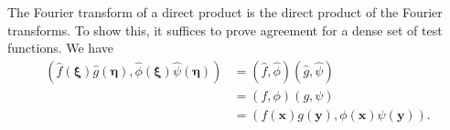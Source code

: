 \begin{Example}
\label{ex:fourier-direct-product}
The Fourier transform of a direct product is the direct product of the Fourier transforms. To show this, it suffices to prove agreement for a dense set of test functions. We have
\begin{equation}\label{eq:fourier-direct-product-separable-proof}
\begin{aligned}
(\widehat f(\bm{\xi})\widehat g(\bm{\eta}),\widehat\phi(\bm{\xi})\widehat\psi(\bm{\eta}))
&=(\widehat f,\widehat\phi)(\widehat g,\widehat\psi)\\
&=(f,\phi)(g,\psi)\\
&=(f(\bm{x})g(\bm{y}),\phi(\bm{x})\psi(\bm{y})).
\end{aligned}
\end{equation}

\end{Example}
